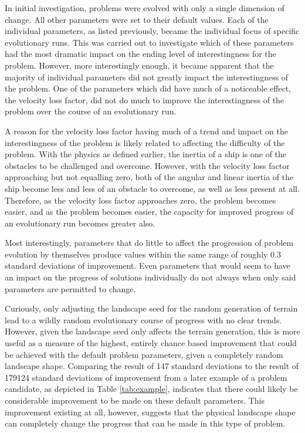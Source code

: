 \documentclass[conference]{IEEEtran}
\begin{document}
In initial investigation, problems were evolved with only a single dimension of change. All other parameters were set to their default values. Each of the individual parameters, as listed previously, became the individual focus of specific evolutionary runs. This was carried out to investigate which of these parameters had the most dramatic impact on the ending level of interestingness for the problem. However, more interestingly enough, it became apparent that the majority of individual parameters did not greatly impact the interestingness of the problem. One of the parameters which did have much of a noticeable effect, the velocity loss factor, did not do much to improve the interestingness of the problem over the course of an evolutionary run. 

A reason for the velocity loss factor having much of a trend and impact on the interestingness of the problem is likely related to affecting the difficulty of the problem. With the physics as defined earlier, the inertia of a ship is one of the obstacles to be challenged and overcome. However, with the velocity loss factor approaching but not equalling zero, both of the angular and linear inertia of the ship become less and less of an obstacle to overcome, as well as less present at all. Therefore, as the velocity loss factor approaches zero, the problem becomes easier, and as the problem becomes easier, the capacity for improved progress of an evolutionary run becomes greater also.

Most interestingly, parameters that do little to affect the progression of problem evolution by themselves produce values within the same range of roughly 0.3 standard deviations of improvement. Even parameters that would seem to have an impact on the progress of solutions individually do not always when only said parameters are permitted to change.

Curiously, only adjusting the landscape seed for the random generation of terrain lead to a wildly random evolutionary course of progress with no clear trends. However, given the landscape seed only affects the terrain generation, this is more useful as a measure of the highest, entirely chance based improvement that could be achieved with the default problem parameters, given a completely random landscape shape. Comparing the result of 147 standard deviations to the result of 179124 standard deviations of improvement from a later example of a problem candidate, as depicted in Table \ref{tab:example}, indicates that there could likely be considerable improvement to be made on these default parameters. This improvement existing at all, however, suggests that the physical landscape shape can completely change the progress that can be made in this type of problem.
\end{document}
